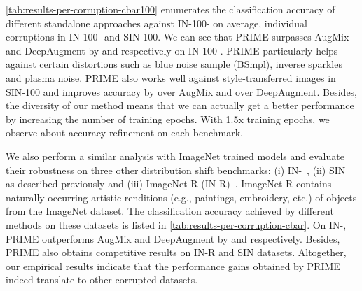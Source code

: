 \documentclass[runningheads]{llncs}
\begin{document}
\cref{tab:results-per-corruption-cbar100} enumerates the classification accuracy of different standalone approaches against IN-100- on average, individual corruptions in IN-100- and SIN-100. We can see that PRIME surpasses AugMix and DeepAugment by  and  respectively on IN-100-. PRIME particularly helps against certain distortions such as blue noise sample (BSmpl), inverse sparkles and plasma noise. PRIME also works well against style-transferred images in SIN-100 and improves accuracy by  over AugMix and  over DeepAugment. Besides, the diversity of our method means that we can actually get a better performance by increasing the number of training epochs. With 1.5x training epochs, we observe about  accuracy refinement on each benchmark. 

We also perform a similar analysis with ImageNet trained models and evaluate their robustness on three other distribution shift benchmarks: (i) IN-~\cite{cbar2021}, (ii) SIN~\cite{styleimagenet2018} as described previously and (iii) ImageNet-R (IN-R)~\cite{deepaugment2021}. ImageNet-R contains naturally occurring artistic renditions (e.g.,
paintings, embroidery, etc.) of objects from the ImageNet dataset. The classification accuracy achieved by different methods on these datasets is listed in \cref{tab:results-per-corruption-cbar}. On IN-, PRIME outperforms AugMix and DeepAugment by  and  respectively. Besides, PRIME also obtains competitive results on IN-R and SIN datasets. \balance Altogether, our empirical results indicate that the performance gains obtained by PRIME indeed translate to other corrupted datasets.
\end{document}
